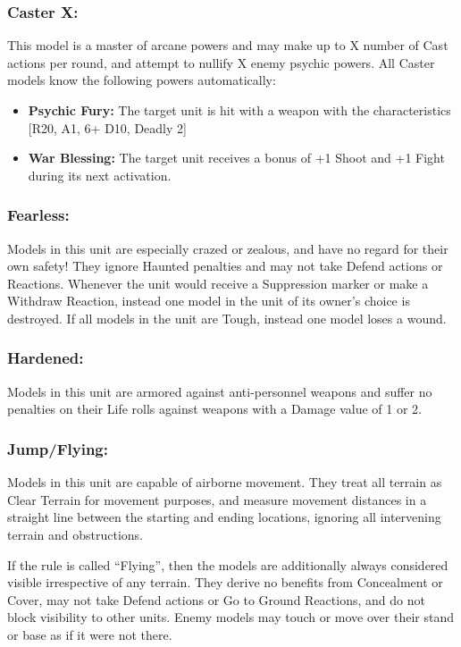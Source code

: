 \begin{multicols}{2}
\subsubsection*{Caster X:} This model is a master of arcane powers and may make up to X number of Cast actions per round, and attempt to nullify X enemy psychic powers. All Caster models know the following powers automatically:

\begin{itemize}
    \item \textbf{Psychic Fury:} The target unit is hit with a weapon with the characteristics [R20, A1, 6+ D10, Deadly 2]
    \item \textbf{War Blessing:} The target unit receives a bonus of +1 Shoot and +1 Fight during its next activation.
\end{itemize}

\subsubsection*{Fearless:} Models in this unit are especially crazed or zealous, and have no regard for their own safety! They ignore Haunted penalties and may not take Defend actions or Reactions. Whenever the unit would receive a Suppression marker or make a Withdraw Reaction, instead one model in the unit of its owner's choice is destroyed. If all models in the unit are Tough, instead one model loses a wound.

\subsubsection*{Hardened:} Models in this unit are armored against anti-personnel weapons and suffer no penalties on their Life rolls against weapons with a Damage value of 1 or 2.

\subsubsection*{Jump/Flying:} Models in this unit are capable of airborne movement. They treat all terrain as Clear Terrain for movement purposes, and measure movement distances in a straight line between the starting and ending locations, ignoring all intervening terrain and obstructions.

If the rule is called ``Flying'', then the models are additionally always considered visible irrespective of any terrain. They derive no benefits from Concealment or Cover, may not take Defend actions or Go to Ground Reactions, and do not block visibility to other units. Enemy models may touch or move over their stand or base as if it were not there.


\end{multicols}
